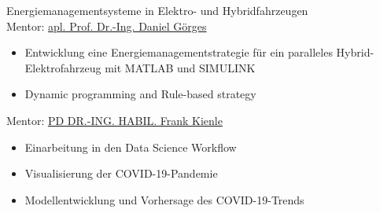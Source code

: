 {\color{blue} Energiemanagementsysteme in Elektro- und Hybridfahrzeugen\\}
Mentor: \href{https://www.eit.uni-kl.de/en/jem/team/}{\color{blue}\hspace{.25em} apl. Prof. Dr.-Ing. Daniel Görges}
\begin{itemize}
	\item Entwicklung eine Energiemanagementstrategie für ein paralleles Hybrid-Elektrofahrzeug mit MATLAB und SIMULINK
	\item Dynamic programming and Rule-based strategy
\end{itemize}
\SmallSep

Mentor: \href{https://ems.eit.uni-kl.de/en/staff/frank-kienle/}{\color{blue}\hspace{.25em} PD DR.-ING. HABIL. Frank Kienle}
\begin{itemize}
	\item Einarbeitung in den Data Science Workflow
	\item Visualisierung der COVID-19-Pandemie
	\item Modellentwicklung und Vorhersage des COVID-19-Trends
\end{itemize}
\SmallSep

